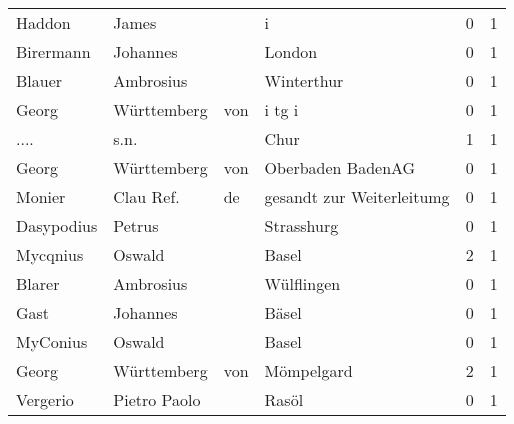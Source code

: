 \begin{tabular}{llllrr}
                   Haddon &                              James &             &                                           i &          0 &         1 \\
                Birermann &                           Johannes &             &                                      London &          0 &         1 \\
                   Blauer &                          Ambrosius &             &                                  Winterthur &          0 &         1 \\
                    Georg &                        Württemberg &         von &                                      i tg i &          0 &         1 \\
                     .... &                               s.n. &             &                                        Chur &          1 &         1 \\
                    Georg &                        Württemberg &         von &                           Oberbaden BadenAG &          0 &         1 \\
                   Monier &                          Clau Ref. &          de &                   gesandt zur Weiterleitumg &          0 &         1 \\
               Dasypodius &                             Petrus &             &                                  Strasshurg &          0 &         1 \\
                 Mycqnius &                             Oswald &             &                                       Basel &          2 &         1 \\
                   Blarer &                          Ambrosius &             &                                  Wülflingen &          0 &         1 \\
                     Gast &                           Johannes &             &                                       Bäsel &          0 &         1 \\
                 MyConius &                             Oswald &             &                                       Basel &          0 &         1 \\
                    Georg &                        Württemberg &         von &                                  Mömpelgard &          2 &         1 \\
                 Vergerio &                       Pietro Paolo &             &                                       Rasöl &          0 &         1 \\

\end{tabular}

